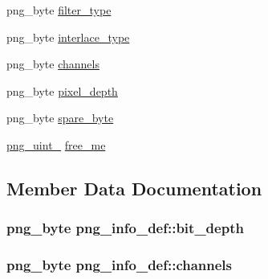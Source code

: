 \begin{DoxyCompactItemize}
\item 
png\+\_\+byte \hyperlink{structpng__info__def_aa9a869f34f99f9d02e476892e68a26ea}{filter\+\_\+type}
\item 
png\+\_\+byte \hyperlink{structpng__info__def_afad8a12cf463fed8ab5fe29e3d85b6c1}{interlace\+\_\+type}
\item 
png\+\_\+byte \hyperlink{structpng__info__def_ab0bafa25f05331940beb673783b1fac8}{channels}
\item 
png\+\_\+byte \hyperlink{structpng__info__def_ab98a44dd6a8e1c0258019469c77ffa2b}{pixel\+\_\+depth}
\item 
png\+\_\+byte \hyperlink{structpng__info__def_a09cbd4c9a9727499a9e2deba0a8e9134}{spare\+\_\+byte}
\item 
\hyperlink{pngrutil_8c_a89824d0e9f0724e3e7799b01a2b5fe58}{png\+\_\+uint\+\_} \hyperlink{structpng__info__def_a80f147934033ea3c3da1addd182b7ef3}{free\+\_\+me}
\end{DoxyCompactItemize}


\subsection{Member Data Documentation}
\hypertarget{structpng__info__def_a437ea0466fea89c1794a8e3aa8d4da9e}{}
\subsubsection[{bit\+\_\+depth}]{\setlength{\rightskip}{0pt plus 5cm}png\+\_\+byte png\+\_\+info\+\_\+def\+::bit\+\_\+depth}\label{structpng__info__def_a437ea0466fea89c1794a8e3aa8d4da9e}
\hypertarget{structpng__info__def_ab0bafa25f05331940beb673783b1fac8}{}
\subsubsection[{channels}]{\setlength{\rightskip}{0pt plus 5cm}png\+\_\+byte png\+\_\+info\+\_\+def\+::channels}\label{structpng__info__def_ab0bafa25f05331940beb673783b1fac8}
\hypertarget{structpng__info__def_aa89dde7a6d87c229e9a4d6313fb4537b}{}
